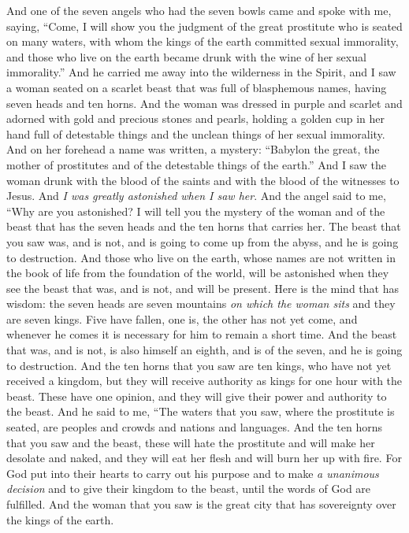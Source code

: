 \begin{biblechapter} %
 And one of the seven angels who had the seven bowls came and spoke with me, saying, “Come, I will show you the judgment of the great prostitute who is seated on many waters,
\verse with whom the kings of the earth committed sexual immorality, and those who live on the earth became drunk with the wine of her sexual immorality.”
\verse And he carried me away into the wilderness in the Spirit, and I saw a woman seated on a scarlet beast that was full of blasphemous names, having seven heads and ten horns.
\verse And the woman was dressed in purple and scarlet and adorned with gold and precious stones and pearls, holding a golden cup in her hand full of detestable things and the unclean things of her sexual immorality.
\verse And on her forehead a name was written, a mystery: “Babylon the great, the mother of prostitutes and of the detestable things of the earth.”
\verse And I saw the woman drunk with the blood of the saints and with the blood of the witnesses to Jesus.
\verse And \textit{I was greatly astonished when I saw her}.
\verse And the angel said to me, “Why are you astonished? I will tell you the mystery of the woman and of the beast that has the seven heads and the ten horns that carries her.
\verse The beast that you saw was, and is not, and is going to come up from the abyss, and he is going to destruction. And those who live on the earth, whose names are not written in the book of life from the foundation of the world, will be astonished when they see the beast that was, and is not, and will be present.
\verse Here is the mind that has wisdom: the seven heads are seven mountains \textit{on which the woman sits} and they are seven kings.
\verse Five have fallen, one is, the other has not yet come, and whenever he comes it is necessary for him to remain a short time.
\verse And the beast that was, and is not, is also himself an eighth, and is of the seven, and he is going to destruction.
\verse And the ten horns that you saw are ten kings, who have not yet received a kingdom, but they will receive authority as kings for one hour with the beast.
\verse These have one opinion, and they will give their power and authority to the beast.
\verse And he said to me, “The waters that you saw, where the prostitute is seated, are peoples and crowds and nations and languages.
\verse And the ten horns that you saw and the beast, these will hate the prostitute and will make her desolate and naked, and they will eat her flesh and will burn her up with fire.
\verse For God put into their hearts to carry out his purpose and to make \textit{a unanimous decision} and to give their kingdom to the beast, until the words of God are fulfilled.
\verse And the woman that you saw is the great city that has sovereignty over the kings of the earth.
\end{biblechapter}

